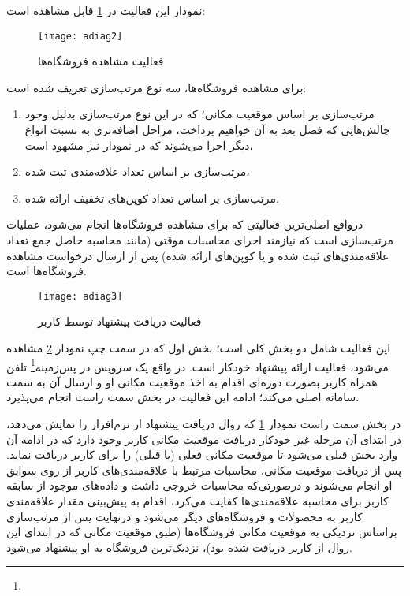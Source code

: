 نمودار این فعالیت در \cref{fig:adiag2} قابل مشاهده است:

\begin{figure}[H]
	\centering
	\texttt{[image: adiag2]}
	\caption{فعالیت مشاهده فروشگاه‌ها}
	\label{fig:adiag2}
\end{figure}

برای مشاهده فروشگاه‌ها، سه نوع مرتب‌سازی تعریف شده است:
\begin{enumerate}
	\item مرتب‌سازی بر اساس موقعیت مکانی؛‌ که در این نوع مرتب‌سازی بدلیل وجود چالش‌هایی که فصل بعد به آن خواهیم پرداخت، مراحل اضافه‌تری به نسبت انواع دیگر اجرا ‌می‌شوند که در نمودار نیز مشهود است،
	\item مرتب‌سازی بر اساس تعداد علاقه‌مندی ثبت شده،
	\item مرتب‌سازی بر اساس تعداد کوپن‌های تخفیف ارائه شده.
\end{enumerate}

درواقع اصلی‌ترین فعالیتی که برای مشاهده فروشگاه‌ها انجام می‌شود، عملیات مرتب‌سازی است که نیازمند اجرای محاسبات موقتی (مانند محاسبه حاصل جمع تعداد علاقه‌مندی‌های ثبت شده و یا کوپن‌های ارائه شده) پس از ارسال درخواست مشاهده فروشگاه‌ها است.


\begin{figure}[H]
	\centering
	\texttt{[image: adiag3]}
	\caption{فعالیت دریافت پیشنهاد توسط کاربر}
	\label{fig:adiag3}
\end{figure}

این فعالیت شامل دو بخش کلی است؛ بخش اول که در سمت چپ نمودار \cref{fig:adiag3} مشاهده می‌شود، فعالیت ارائه پیشنهاد خودکار است. در واقع یک سرویس در پس‌زمینه\footnote{} تلفن همراه کاربر بصورت دوره‌ای اقدام به اخذ موقعیت مکانی او و ارسال آن به سمت سامانه اصلی می‌کند؛ ادامه این فعالیت در بخش سمت راست انجام می‌پذیرد.

در بخش سمت راست نمودار \cref{fig:adiag2} که روال دریافت پیشنهاد از نرم‌افزار را نمایش می‌دهد، در ابتدای آن مرحله غیر خودکار دریافت موقعیت مکانی کاربر وجود دارد که در ادامه آن وارد بخش قبلی می‌شود تا موقعیت مکانی فعلی (یا قبلی) را برای کاربر دریافت نماید. پس از دریافت موقعیت مکانی، محاسبات مرتبط با علاقه‌مندی‌های کاربر از روی سوابق او انجام می‌شوند و درصورتی‌که محاسبات خروجی داشت و داده‌های موجود از سابقه کاربر برای محاسبه علاقه‌مندی‌ها کفایت می‌کرد، اقدام به پیش‌بینی مقدار علاقه‌مندی کاربر به محصولات و فروشگاه‌های دیگر می‌شود و درنهایت پس از مرتب‌سازی براساس نزدیکی به موقعیت مکانی فروشگاه‌ها (طبق موقعیت مکانی که در ابتدای این روال از کاربر دریافت شده بود)، نزدیک‌ترین فروشگاه به او پیشنهاد می‌شود.


